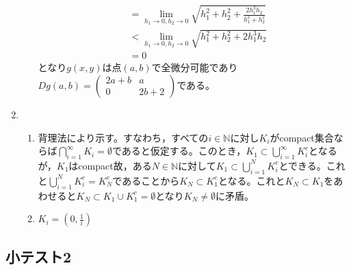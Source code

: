 \documentclass[dvipdfmx,a4j,10pt]{jsarticle}
\theoremstyle{mystyle1}
\theoremstyle{mystyle2}
\begin{document}
\begin{enumerate}
\begin{enumerate}
\[\begin{split}
            &=\lim_{h_1\to0,h_2\to0}\sqrt{h_1^2+h_2^2+\frac{2h_1^3h_2}{h_1^2+h_2^2}}\\
            &<\lim_{h_1\to0,h_2\to0}\sqrt{h_1^2+h_2^2+2h_1^3h_2}\\
            &=0
            \end{split}
            \]
            となり$g(x,y)$は点$(a,b)$で全微分可能であり$Dg(a,b)=\begin{pmatrix} 2a+b & a \\ 0 & 2b+2 \end{pmatrix}$である。
        \end{enumerate}
    \item
        \begin{enumerate}\renewcommand{\labelenumii}{(\arabic{enumii})}
            \item 背理法により示す。すなわち，すべての$i\in\mathbb{N}$に対し$K_i$がcompact集合ならば$\displaystyle\bigcap_{i=1}^\infty K_i=\emptyset$であると仮定する。このとき，$\displaystyle K_1\subset \bigcup_{i=1}^\infty K_i^c$となるが，$K_1$はcompact故，ある$N\in\mathbb{N}$に対して$\displaystyle K_1\subset \bigcup_{i=1}^N K_i^c$とできる。これと$\displaystyle \bigcup_{i=1}^N K_i^c=K_N^c$であることから$K_N\subset K_1^c$となる。これと$K_N\subset K_1$をあわせると$K_N\subset K_1\cup K_1^c=\emptyset$となり$K_N\neq\emptyset$に矛盾。
            \item $\displaystyle K_i=\left(0,\frac{1}{i}\right)$
        \end{enumerate}
\end{enumerate}

\newpage

\subsection{小テスト2}
\end{document}
